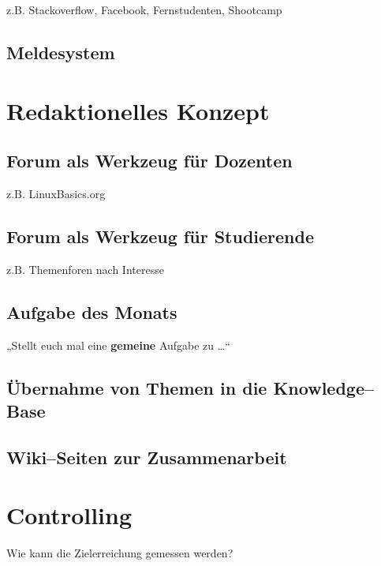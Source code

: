 z.B. Stackoverflow, Facebook, Fernstudenten, Shootcamp

\subsection{Meldesystem} %
\label{sub:meldesystem}



\section{Redaktionelles Konzept} %
\label{sec:redaktionelles_konzept}
\subsection{Forum als Werkzeug für Dozenten} %
\label{sub:forum_als_werkzeug_fur_dozenten}
z.B. LinuxBasics.org

\subsection{Forum als Werkzeug für Studierende} %
\label{sub:forum_als_werkzeug_fur_studierende}
z.B. Themenforen nach Interesse

\subsection{Aufgabe des Monats} %
\label{sub:aufgabe_des_monats}

„Stellt euch mal eine \textbf{gemeine} Aufgabe zu …“

\subsection{Übernahme von Themen in die Knowledge--Base} %
\label{sub:ubernahme_von_themen_in_die_knowledge_base}


\subsection{Wiki--Seiten zur Zusammenarbeit} %
\label{sub:wiki_seiten_zur_zusammenarbeit}



\section{Controlling} %
\label{sec:controlling}
Wie kann die Zielerreichung gemessen werden?
